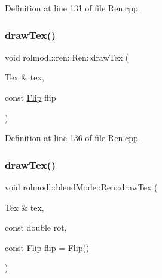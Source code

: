 Definition at line 131 of file Ren.\+cpp.

\mbox{\label{classrolmodl_1_1blend_mode_1_1_ren_a1bfd523ccd66499aadbac44943452a5d}} 
\subsubsection{\texorpdfstring{drawTex()}{drawTex()}\hspace{0.1cm}{\footnotesize\ttfamily [10/36]}}
{\footnotesize\ttfamily void rolmodl\+::ren\+::\+Ren\+::draw\+Tex (\begin{DoxyParamCaption}\item[{Tex \&}]{tex,  }\item[{const \mbox{\hyperlink{structrolmodl_1_1blend_mode_1_1_flip}{Flip}}}]{flip }\end{DoxyParamCaption})}



Definition at line 136 of file Ren.\+cpp.

\mbox{\label{classrolmodl_1_1blend_mode_1_1_ren_aaadddb46a04e91f920e9585d3b4b94fa}} 
\subsubsection{\texorpdfstring{drawTex()}{drawTex()}\hspace{0.1cm}{\footnotesize\ttfamily [11/36]}}
{\footnotesize\ttfamily void rolmodl\+::blend\+Mode\+::\+Ren\+::draw\+Tex (\begin{DoxyParamCaption}\item[{Tex \&}]{tex,  }\item[{const double}]{rot,  }\item[{const \mbox{\hyperlink{structrolmodl_1_1blend_mode_1_1_flip}{Flip}}}]{flip = {\ttfamily \mbox{\hyperlink{structrolmodl_1_1blend_mode_1_1_flip}{Flip}}()} }\end{DoxyParamCaption})}

\mbox{\label{classrolmodl_1_1blend_mode_1_1_ren_ac7757a8eb59e1ad23fc8475c8ccc2dc6}} 
